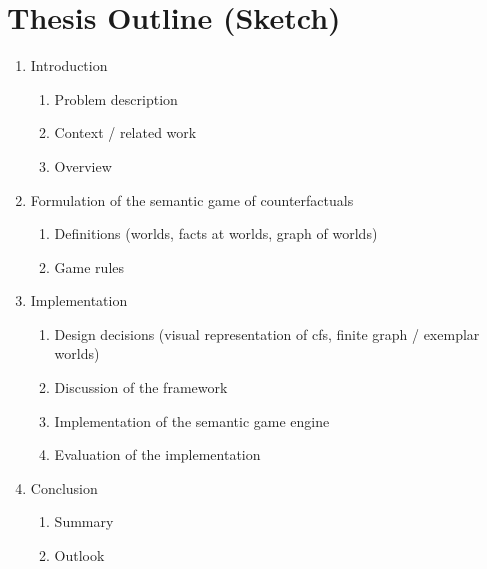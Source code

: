 \documentclass[a4paper,american]{paper}
\begin{document}
\section*{Thesis Outline (Sketch)}

\begin{enumerate}
	\item Introduction
	\begin{enumerate}
		\item Problem description
		\item Context / related work
		\item Overview
	\end{enumerate}
	\item Formulation of the semantic game of counterfactuals
	\begin{enumerate}
		\item Definitions (worlds, facts at worlds, graph of worlds)
		\item Game rules
	\end{enumerate}
	\item Implementation
	\begin{enumerate}
		\item Design decisions (visual representation of cfs, finite graph / exemplar worlds)
		\item Discussion of the framework
		\item Implementation of the semantic game engine
		\item Evaluation of the implementation
	\end{enumerate}
	\item Conclusion
	\begin{enumerate}
		\item Summary
		\item Outlook
	\end{enumerate}
\end{enumerate}


\nocite{*}

\end{document}

